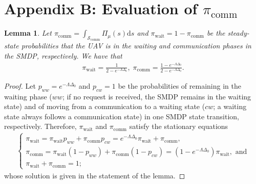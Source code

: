 \documentclass[12pt, draftcls, onecolumn]{IEEEtran}
\theoremstyle{plain}
\newtheorem{lemma}{Lemma}
\theoremstyle{definition}
\theoremstyle{remark}
\begin{document}
\section*{Appendix B: Evaluation of $\pi_{\mathrm{comm}}$}\label{AB}
\vspace{-2mm}

\begin{lemma}\label{lem:SSComm}
	Let $\pi_{\mathrm{comm}}{=}\int_{\mathcal{S}_{\mathrm{comm}}}\!\!\!\!\!\Pi_{\mu}(s)\mathrm{d}s$ and $\pi_{\mathrm{wait}}{=}1{-}\pi_{\mathrm{comm}}$ be the steady-state probabilities that the UAV is in the waiting and communication phases in the SMDP, respectively. We have that
    \begin{align}\label{eq:SSCommResult}
    	\pi_{\mathrm{wait}} = \frac{1}{2-e^{-\Lambda \Delta_0}}, \; \pi_{\mathrm{comm}} = \frac{1-e^{-\Lambda \Delta_0}}{2-e^{-\Lambda \Delta_0}}.
    \end{align}
\end{lemma}

\begin{proof}
Let $p_{ww}{=}e^{-\Lambda\Delta_{0}}$ and $p_{cw}{=}1$ 
be the probabilities of remaining in the waiting phase ($ww$; if no request is received, the SMDP remains in the waiting state) and of moving from a communication to a waiting state ($cw$; 
a waiting state always follows a communication state) in one SMDP state transition, respectively. Therefore, $\pi_{\mathrm{wait}}$ and $\pi_{\mathrm{comm}}$ satisfy the stationary equations
\begin{align}
    \begin{cases}
        \pi_{\mathrm{wait}} = \pi_{\mathrm{wait}}p_{ww} + \pi_{\mathrm{comm}}p_{cw} \nonumber
        =e^{-\Lambda \Delta_0}\pi_{\mathrm{wait}} + \pi_{\mathrm{comm}},
        \\
        \pi_{\mathrm{comm}} = \pi_{\mathrm{wait}}(1-p_{ww}) + \pi_{\mathrm{comm}}(1-p_{cw})
        =(1-e^{-\Lambda \Delta_0})\pi_{\mathrm{wait}},\text{ and}\nonumber \\
        \pi_{\mathrm{wait}} + \pi_{\mathrm{comm}} = 1;
    \end{cases}
\end{align}
whose solution is given in the statement of the lemma.
\end{proof}
\vspace{-4mm}



 
\end{document}
